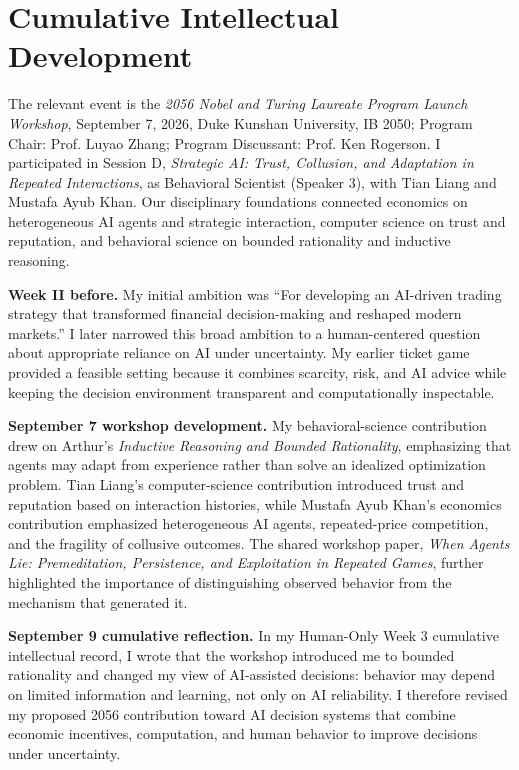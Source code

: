 \section{Cumulative Intellectual Development}
The relevant event is the \textit{2056 Nobel and Turing Laureate Program Launch Workshop}, September 7, 2026, Duke Kunshan University, IB 2050; Program Chair: Prof. Luyao Zhang; Program Discussant: Prof. Ken Rogerson. I participated in Session D, \textit{Strategic AI: Trust, Collusion, and Adaptation in Repeated Interactions}, as Behavioral Scientist (Speaker 3), with Tian Liang and Mustafa Ayub Khan. Our disciplinary foundations connected economics on heterogeneous AI agents and strategic interaction, computer science on trust and reputation, and behavioral science on bounded rationality and inductive reasoning.

\textbf{Week II before.}
My initial ambition was ``For developing an AI-driven trading strategy that transformed financial decision-making and reshaped modern markets.'' I later narrowed this broad ambition to a human-centered question about appropriate reliance on AI under uncertainty. My earlier ticket game provided a feasible setting because it combines scarcity, risk, and AI advice while keeping the decision environment transparent and computationally inspectable.

\textbf{September 7 workshop development.}
My behavioral-science contribution drew on Arthur's \textit{Inductive Reasoning and Bounded Rationality}, emphasizing that agents may adapt from experience rather than solve an idealized optimization problem. Tian Liang's computer-science contribution introduced trust and reputation based on interaction histories, while Mustafa Ayub Khan's economics contribution emphasized heterogeneous AI agents, repeated-price competition, and the fragility of collusive outcomes. The shared workshop paper, \textit{When Agents Lie: Premeditation, Persistence, and Exploitation in Repeated Games}, further highlighted the importance of distinguishing observed behavior from the mechanism that generated it.

\textbf{September 9 cumulative reflection.}
In my Human-Only Week 3 cumulative intellectual record, I wrote that the workshop introduced me to bounded rationality and changed my view of AI-assisted decisions: behavior may depend on limited information and learning, not only on AI reliability. I therefore revised my proposed 2056 contribution toward AI decision systems that combine economic incentives, computation, and human behavior to improve decisions under uncertainty.

